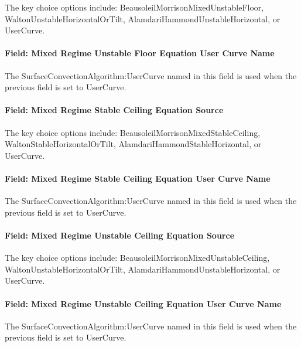 The key choice options include: BeausoleilMorrisonMixedUnstableFloor, WaltonUnstableHorizontalOrTilt, AlamdariHammondUnstableHorizontal, or UserCurve.

\paragraph{Field: Mixed Regime Unstable Floor Equation User Curve Name}\label{field-mixed-regime-unstable-floor-equation-user-curve-name}

The SurfaceConvectionAlgorithm:UserCurve named in this field is used when the previous field is set to UserCurve.

\paragraph{Field: Mixed Regime Stable Ceiling Equation Source}\label{field-mixed-regime-stable-ceiling-equation-source}

The key choice options include: BeausoleilMorrisonMixedStableCeiling, WaltonStableHorizontalOrTilt, AlamdariHammondStableHorizontal, or UserCurve.

\paragraph{Field: Mixed Regime Stable Ceiling Equation User Curve Name}\label{field-mixed-regime-stable-ceiling-equation-user-curve-name}

The SurfaceConvectionAlgorithm:UserCurve named in this field is used when the previous field is set to UserCurve.

\paragraph{Field: Mixed Regime Unstable Ceiling Equation Source}\label{field-mixed-regime-unstable-ceiling-equation-source}

The key choice options include: BeausoleilMorrisonMixedUnstableCeiling, WaltonUnstableHorizontalOrTilt, AlamdariHammondUnstableHorizontal, or UserCurve.

\paragraph{Field: Mixed Regime Unstable Ceiling Equation User Curve Name}\label{field-mixed-regime-unstable-ceiling-equation-user-curve-name}

The SurfaceConvectionAlgorithm:UserCurve named in this field is used when the previous field is set to UserCurve.

